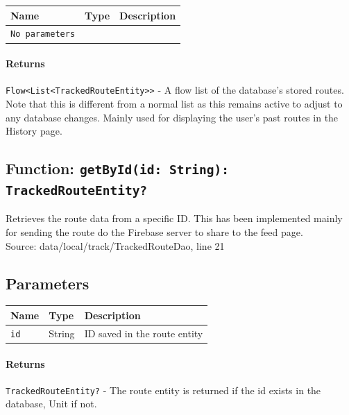 \documentclass{article}
\begin{document}
                \begin{tabular}{p{3cm} p{4cm} p{7cm}}
                \toprule
                \textbf{Name} & \textbf{Type} & \textbf{Description} \\ \midrule
                \texttt{No parameters} \\ \bottomrule
                \end{tabular}

                \paragraph{Returns} \texttt{Flow<List<TrackedRouteEntity>>} - A flow list of the database's stored routes.
                Note that this is different from a normal list as this remains active to adjust to any database changes.
                Mainly used for displaying the user's past routes in the History page.

            \hrulefill

            \subsection*{Function: \texttt{getById(id: String): TrackedRouteEntity?}}

                Retrieves the route data from a specific ID. This has been implemented mainly
                for sending the route do the Firebase server to share to the feed page. \\
                Source: data/local/track/TrackedRouteDao, line 21
                
                \subsection*{Parameters}

                \begin{tabular}{p{3cm} p{4cm} p{7cm}}
                \toprule
                \textbf{Name} & \textbf{Type} & \textbf{Description} \\ \midrule
                \texttt{id} & String & ID saved in the route entity \\ \bottomrule
                \end{tabular}

                \paragraph{Returns} \texttt{TrackedRouteEntity?} - The route entity is returned if the 
                id exists in the database, Unit if not.
\end{document}
